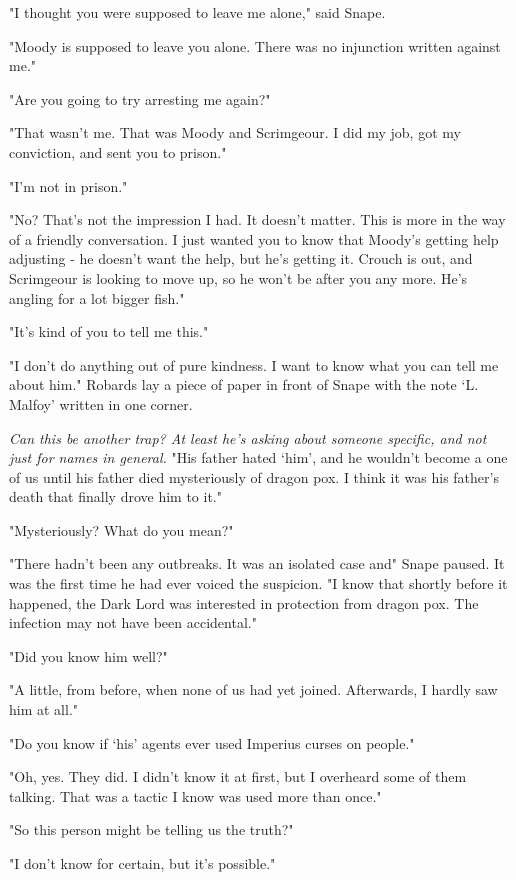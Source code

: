 "I thought you were supposed to leave me alone," said Snape.

"Moody is supposed to leave you alone. There was no injunction written against me."

"Are you going to try arresting me again?"

"That wasn't me. That was Moody and Scrimgeour. I did my job, got my conviction, and sent you to prison."

"I'm not in prison."

"No? That's not the impression I had. It doesn't matter. This is more in the way of a friendly conversation. I just wanted you to know that Moody's getting help adjusting - he doesn't want the help, but he's getting it. Crouch is out, and Scrimgeour is looking to move up, so he won't be after you any more. He's angling for a lot bigger fish."

"It's kind of you to tell me this."

"I don't do anything out of pure kindness. I want to know what you can tell me about him." Robards lay a piece of paper in front of Snape with the note `L. Malfoy' written in one corner.

\emph{Can this be another trap? At least he's asking about someone specific, and not just for names in general.} "His father hated{\el} `him', and he wouldn't become a{\el} one of us until his father died mysteriously of dragon pox. I think it was his father's death that finally drove him to it."

"Mysteriously? What do you mean?"

"There hadn't been any outbreaks. It was an isolated case and{\el}" Snape paused. It was the first time he had ever voiced the suspicion. "I know that shortly before it happened, the Dark Lord was interested in protection from dragon pox. The infection may not have been accidental."

"Did you know him well?"

"A little, from before, when none of us had yet joined. Afterwards, I hardly saw him at all."

"Do you know if{\el} `his' agents ever used Imperius curses on people."

"Oh, yes. They did. I didn't know it at first, but I overheard some of them talking. That was a tactic I know was used more than once."

"So this person might be telling us the truth?"

"I don't know for certain, but it's possible."

